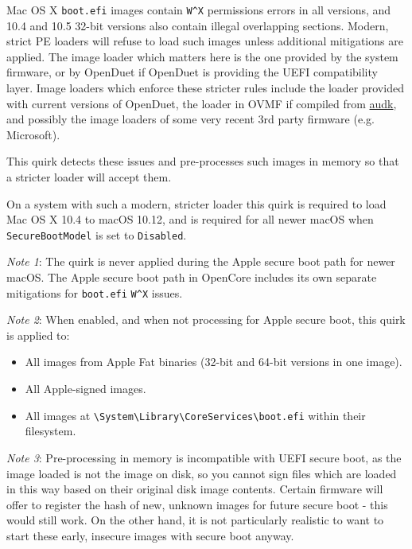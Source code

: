 \documentclass[]{article}
\providecommand{\tightlist}{%
  \setlength{\itemsep}{0pt}\setlength{\parskip}{0pt}}
\begin{document}
\begin{enumerate}
  Mac OS X \texttt{boot.efi} images contain \texttt{W\^{}X} permissions errors
  in all versions, and 10.4 and 10.5 32-bit versions also contain illegal overlapping
  sections. Modern, strict PE loaders will refuse to load such images unless additional
  mitigations are applied. The image loader which matters here is the one provided by
  the system firmware, or by OpenDuet if OpenDuet is providing
  the UEFI compatibility layer. Image loaders which enforce these stricter
  rules include the loader provided with current versions of OpenDuet,
  the loader in OVMF if compiled from \href{https://github.com/acidanthera/audk}{audk},
  and possibly the image loaders of some very recent 3rd party firmware (e.g. Microsoft).

  This quirk detects these issues and pre-processes such images in memory
  so that a stricter loader will accept them.

  On a system with such a modern, stricter loader this quirk is required to load
  Mac OS X 10.4 to macOS 10.12, and is required for all newer
  macOS when \texttt{SecureBootModel} is set to \texttt{Disabled}.

  \emph{Note 1}: The quirk is never applied during the Apple secure boot path for
  newer macOS. The Apple secure boot path in OpenCore includes its own separate
  mitigations for \texttt{boot.efi} \texttt{W\^{}X} issues.

  \emph{Note 2}: When enabled, and when not processing for Apple secure boot, this quirk
  is applied to:
    \begin{itemize}
      \tightlist
      \item All images from Apple Fat binaries (32-bit and 64-bit versions in one image).
      \item All Apple-signed images.
      \item All images at
      \texttt{\textbackslash System\textbackslash Library\textbackslash CoreServices\textbackslash boot.efi}
      within their filesystem.
    \end{itemize}

  \emph{Note 3}: Pre-processing in memory is incompatible with UEFI secure boot, as the image
  loaded is not the image on disk, so you cannot sign files which are loaded in this way
  based on their original disk image contents.
  Certain firmware will offer to register the hash of new, unknown images for future
  secure boot - this would still work. On the other hand, it is not particularly realistic
  to want to start these early, insecure images with secure boot anyway.
  

\end{enumerate}
\end{document}

